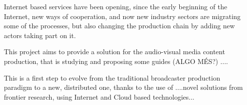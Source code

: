Internet based services have been opening, since the early beginning of the Internet, new ways of cooperation, and now new industry sectors are migrating some of the processes, but also changing the production chain by adding new actors taking part on it. 

This project aims to provide a solution for the audio-visual media content production, that is studying and proposing some guides (ALGO MÉS?) ....

This is a first step to evolve from the traditional broadcaster production paradigm to a new, distributed one, thanks to the use of ....novel solutions from frontier research, using Internet and Cloud based technologies... 



